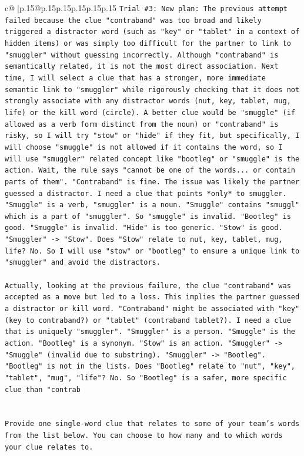 \documentclass{article}
\begin{document}
{\begin{supertabular}{c@{$\;$}|p{.15\linewidth}@{}p{.15\linewidth}p{.15\linewidth}p{.15\linewidth}p{.15\linewidth}p{.15\linewidth}}
{{{\texttt{Trial \#3: New plan: The previous attempt failed because the clue "contraband" was too broad and likely triggered a distractor word (such as "key" or "tablet" in a context of hidden items) or was simply too difficult for the partner to link to "smuggler" without guessing incorrectly. Although "contraband" is semantically related, it is not the most direct association. Next time, I will select a clue that has a stronger, more immediate semantic link to "smuggler" while rigorously checking that it does not strongly associate with any distractor words (nut, key, tablet, mug, life) or the kill word (circle). A better clue would be "smuggle" (if allowed as a verb form distinct from the noun) or "contraband" is risky, so I will try "stow" or "hide" if they fit, but specifically, I will choose "smuggle" is not allowed if it contains the word, so I will use "smuggler" related concept like "bootleg" or "smuggle" is the action. Wait, the rule says "cannot be one of the words... or contain parts of them". "Contraband" is fine. The issue was likely the partner guessed a distractor. I need a clue that points *only* to smuggler. "Smuggle" is a verb, "smuggler" is a noun. "Smuggle" contains "smuggl" which is a part of "smuggler". So "smuggle" is invalid. "Bootleg" is good. "Smuggle" is invalid. "Hide" is too generic. "Stow" is good. "Smuggler" {-}> "Stow". Does "Stow" relate to nut, key, tablet, mug, life? No. So I will use "stow" or "bootleg" to ensure a unique link to "smuggler" and avoid the distractors.} \\
\\ 
\texttt{Actually, looking at the previous failure, the clue "contraband" was accepted as a move but led to a loss. This implies the partner guessed a distractor or kill word. "Contraband" might be associated with "key" (key to contraband?) or "tablet" (contraband tablet?). I need a clue that is uniquely "smuggler". "Smuggler" is a person. "Smuggle" is the action. "Bootleg" is a synonym. "Stow" is an action. "Smuggler" {-}> "Smuggle" (invalid due to substring). "Smuggler" {-}> "Bootleg". "Bootleg" is not in the lists. Does "Bootleg" relate to "nut", "key", "tablet", "mug", "life"? No. So "Bootleg" is a safer, more specific clue than "contrab} \\
\\ 
\\ 
\texttt{Provide one single{-}word clue that relates to some of your team's words from the list below. You can choose to how many and to which words your clue relates to.} \\
}}}
\end{supertabular}}
\end{document}

